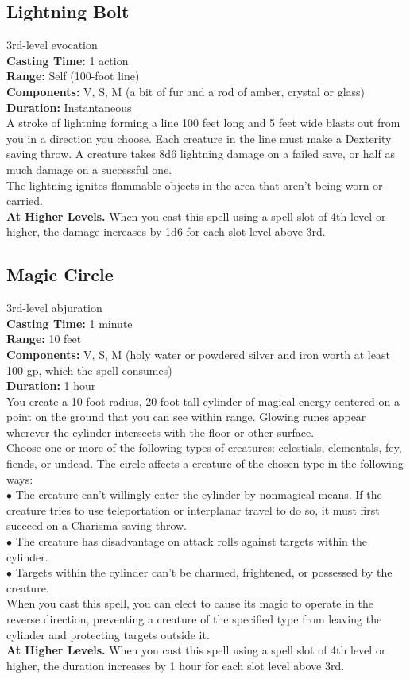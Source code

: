 \documentclass[11pt, A4paper, english]{article}
\begin{document}
		\subsection{Lightning Bolt}
3rd-level evocation \\
\textbf{Casting Time:} 1 action \\
\textbf{Range:} Self (100-foot line) \\
\textbf{Components:} V, S, M (a bit of fur and a rod of amber, crystal or glass) \\
\textbf{Duration:} Instantaneous \\
A stroke of lightning forming a line 100 feet long and 5 feet wide blasts out from you in a direction you choose. Each creature in the line must make a Dexterity saving throw. A creature takes 8d6 lightning damage on a failed save, or half as much damage on a successful one. \\
The lightning ignites flammable objects in the area that aren’t being worn or carried. \\
\textbf{At Higher Levels.} When you cast this spell using a spell slot of 4th level or higher, the damage increases by 1d6 for each slot level above 3rd.

		\subsection{Magic Circle}
3rd-level abjuration \\
\textbf{Casting Time:} 1 minute \\
\textbf{Range:} 10 feet \\
\textbf{Components:} V, S, M (holy water or powdered silver and iron worth at least 100 gp, which the spell consumes) \\
\textbf{Duration:} 1 hour \\
You create a 10-foot-radius, 20-foot-tall cylinder of magical energy centered on a point on the ground that you can see within range. Glowing runes appear wherever the cylinder intersects with the floor or other surface. \\
Choose one or more of the following types of creatures: celestials, elementals, fey, fiends, or undead. The circle affects a creature of the chosen type in the following ways: \\
$\bullet$ The creature can’t willingly enter the cylinder by nonmagical means. If the creature tries to use teleportation or interplanar travel to do so, it must first succeed on a Charisma saving throw. \\
$\bullet$ The creature has disadvantage on attack rolls against targets within the cylinder. \\
$\bullet$ Targets within the cylinder can’t be charmed, frightened, or possessed by the creature. \\
When you cast this spell, you can elect to cause its magic to operate in the reverse direction, preventing a creature of the specified type from leaving the cylinder and protecting targets outside it. \\
\textbf{At Higher Levels.} When you cast this spell using a spell slot of 4th level or higher, the duration increases by 1 hour for each slot level above 3rd.
\end{document}
